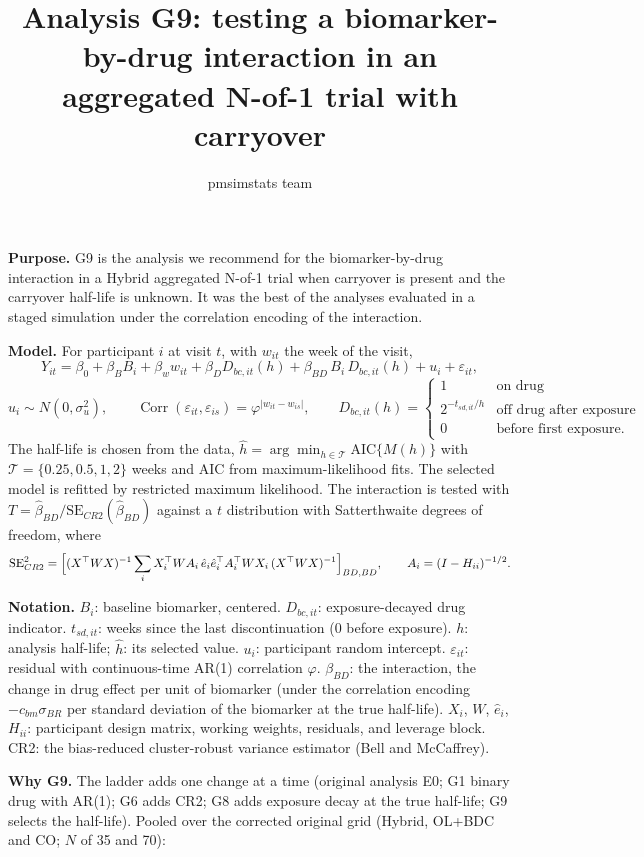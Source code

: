 \documentclass[
  9pt,
]{article}
\title{Analysis G9: testing a biomarker-by-drug interaction in an
aggregated N-of-1 trial with carryover}
\author{pmsimstats team}
\date{}
\begin{document}
\maketitle

\textbf{Purpose.} G9 is the analysis we recommend for the
biomarker-by-drug interaction in a Hybrid aggregated N-of-1 trial when
carryover is present and the carryover half-life is unknown. It was the
best of the analyses evaluated in a staged simulation under the
correlation encoding of the interaction.

\textbf{Model.} For participant \(i\) at visit \(t\), with \(w_{it}\)
the week of the visit,
\[Y_{it}=\beta_0+\beta_B B_i+\beta_w w_{it}+\beta_D D_{bc,it}(h)+\beta_{BD}\,B_i\,D_{bc,it}(h)+u_i+\varepsilon_{it},\]
\[u_i\sim N(0,\sigma_u^2),\qquad \operatorname{Corr}(\varepsilon_{it},\varepsilon_{is})=\varphi^{|w_{it}-w_{is}|},\qquad
D_{bc,it}(h)=\begin{cases}1&\text{on drug}\\ 2^{-t_{sd,it}/h}&\text{off drug after exposure}\\ 0&\text{before first exposure.}\end{cases}\]
The half-life is chosen from the data,
\(\hat h=\arg\min_{h\in\mathcal T}\mathrm{AIC}\{M(h)\}\) with
\(\mathcal T=\{0.25,0.5,1,2\}\) weeks and AIC from maximum-likelihood
fits. The selected model is refitted by restricted maximum likelihood.
The interaction is tested with
\(T=\hat\beta_{BD}/\mathrm{SE}_{CR2}(\hat\beta_{BD})\) against a \(t\)
distribution with Satterthwaite degrees of freedom, where
\[\mathrm{SE}^2_{CR2}=\Bigl[(X^\top WX)^{-1}\sum_i X_i^\top W A_i\,\hat e_i\hat e_i^\top A_i^\top W X_i\,(X^\top WX)^{-1}\Bigr]_{BD,BD},\qquad A_i=(I-H_{ii})^{-1/2}.\]

\textbf{Notation.} \(B_i\): baseline biomarker, centered. \(D_{bc,it}\):
exposure-decayed drug indicator. \(t_{sd,it}\): weeks since the last
discontinuation (0 before exposure). \(h\): analysis half-life;
\(\hat h\): its selected value. \(u_i\): participant random intercept.
\(\varepsilon_{it}\): residual with continuous-time AR(1) correlation
\(\varphi\). \(\beta_{BD}\): the interaction, the change in drug effect
per unit of biomarker (under the correlation encoding
\(-c_{bm}\sigma_{BR}\) per standard deviation of the biomarker at the
true half-life). \(X_i\), \(W\), \(\hat e_i\), \(H_{ii}\): participant
design matrix, working weights, residuals, and leverage block. CR2: the
bias-reduced cluster-robust variance estimator (Bell and McCaffrey).

\textbf{Why G9.} The ladder adds one change at a time (original analysis
E0; G1 binary drug with AR(1); G6 adds CR2; G8 adds exposure decay at
the true half-life; G9 selects the half-life). Pooled over the corrected
original grid (Hybrid, OL+BDC and CO; \(N\) of 35 and 70):
\end{document}
